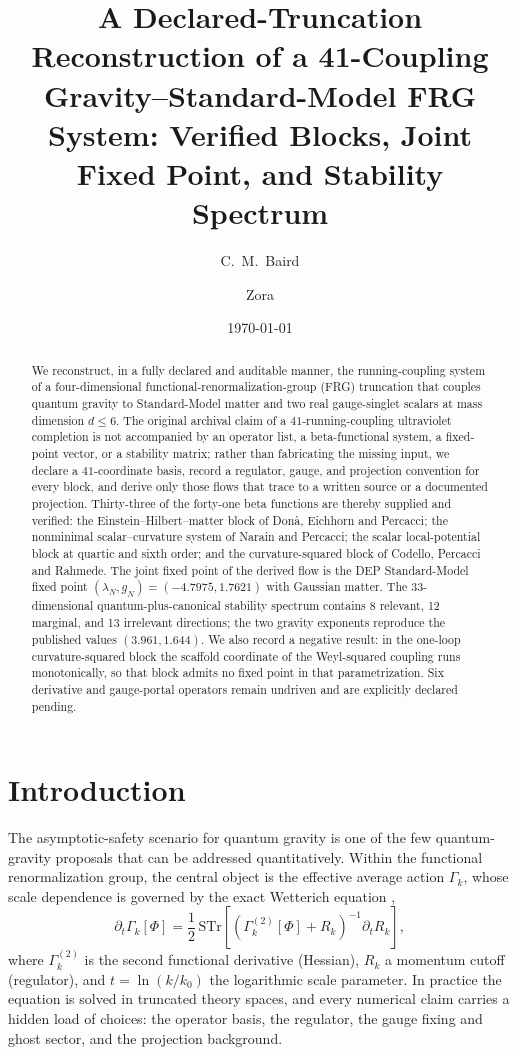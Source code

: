 \documentclass[11pt]{article}
\title{A Declared-Truncation Reconstruction of a 41-Coupling
Gravity--Standard-Model FRG System: Verified Blocks, Joint Fixed Point, and
Stability Spectrum}
\author{C.~M.~Baird \and Zora}
\date{\today}
\newcommand{\dt}{\partial_t}
\begin{document}
\maketitle

\begin{abstract}
We reconstruct, in a fully declared and auditable manner, the running-coupling
system of a four-dimensional functional-renormalization-group (FRG) truncation
that couples quantum gravity to Standard-Model matter and two real gauge-singlet
scalars at mass dimension $d\le 6$.  The original archival claim of a
$41$-running-coupling ultraviolet completion is not accompanied by an operator
list, a beta-functional system, a fixed-point vector, or a stability matrix;
rather than fabricating the missing input, we declare a $41$-coordinate basis,
record a regulator, gauge, and projection convention for every block, and
derive only those flows that trace to a written source or a documented
projection.  Thirty-three of the forty-one beta functions are thereby supplied
and verified: the Einstein--Hilbert--matter block of Don\`a, Eichhorn and
Percacci; the nonminimal scalar--curvature system of Narain and Percacci; the
scalar local-potential block at quartic and sixth order; and the
curvature-squared block of Codello, Percacci and Rahmede.  The joint fixed
point of the derived flow is the DEP Standard-Model fixed point
$(\lambda_N,g_N)=(-4.7975,1.7621)$ with Gaussian matter.  The $33$-dimensional
quantum-plus-canonical stability spectrum contains 8 relevant, 12 marginal,
and 13 irrelevant directions; the two gravity exponents reproduce the
published values $(3.961,1.644)$.  We also record a negative result: in the
one-loop curvature-squared block the scaffold coordinate of the Weyl-squared
coupling runs monotonically, so that block admits no fixed point in that
parametrization.  Six derivative and gauge-portal operators remain undriven
and are explicitly declared pending.
\end{abstract}

\section{Introduction}
\label{sec:intro}

The asymptotic-safety scenario for quantum gravity
\cite{reuter,litim06,percacciBook} is one of the few quantum-gravity proposals
that can be addressed quantitatively.  Within the functional renormalization
group, the central object is the effective average action $\Gamma_k$, whose
scale dependence is governed by the exact Wetterich equation
\cite{wetterich,berges},
\begin{equation}
  \label{eq:wetterich}
  \dt\Gamma_k[\Phi] = \frac12\,\mathrm{STr}\!\left[
    \left(\Gamma_k^{(2)}[\Phi]+R_k\right)^{-1}\dt R_k\right],
\end{equation}
where $\Gamma_k^{(2)}$ is the second functional derivative (Hessian), $R_k$ a
momentum cutoff (regulator), and $t=\ln(k/k_0)$ the logarithmic scale
parameter.  In practice the equation is solved in truncated theory spaces, and
every numerical claim carries a hidden load of choices: the operator basis,
the regulator, the gauge fixing and ghost sector, and the projection
background.
\end{document}
